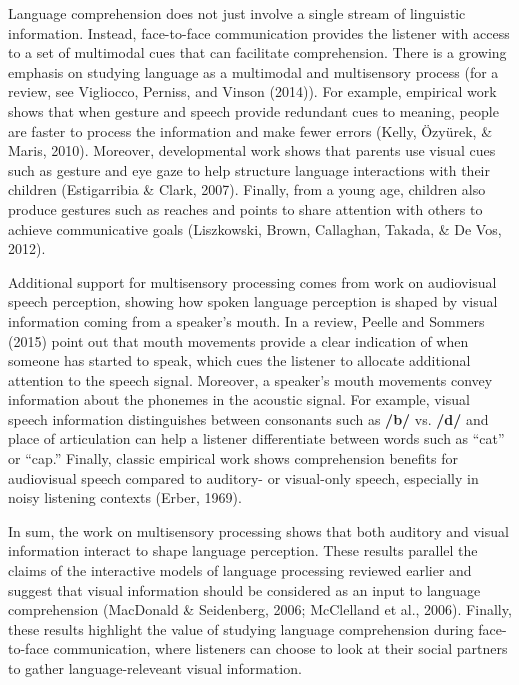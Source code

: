 \documentclass[english,floatsintext,man]{apa6}
\begin{document}
Language comprehension does not just involve a single stream of
linguistic information. Instead, face-to-face communication provides the
listener with access to a set of multimodal cues that can facilitate
comprehension. There is a growing emphasis on studying language as a
multimodal and multisensory process (for a review, see Vigliocco,
Perniss, and Vinson (2014)). For example, empirical work shows that when
gesture and speech provide redundant cues to meaning, people are faster
to process the information and make fewer errors (Kelly, Özyürek, \&
Maris, 2010). Moreover, developmental work shows that parents use visual
cues such as gesture and eye gaze to help structure language
interactions with their children (Estigarribia \& Clark, 2007). Finally,
from a young age, children also produce gestures such as reaches and
points to share attention with others to achieve communicative goals
(Liszkowski, Brown, Callaghan, Takada, \& De Vos, 2012).

Additional support for multisensory processing comes from work on
audiovisual speech perception, showing how spoken language perception is
shaped by visual information coming from a speaker's mouth. In a review,
Peelle and Sommers (2015) point out that mouth movements provide a clear
indication of when someone has started to speak, which cues the listener
to allocate additional attention to the speech signal. Moreover, a
speaker's mouth movements convey information about the phonemes in the
acoustic signal. For example, visual speech information distinguishes
between consonants such as \textbf{/b/} vs. \textbf{/d/} and place of
articulation can help a listener differentiate between words such as
\enquote{cat} or \enquote{cap.} Finally, classic empirical work shows
comprehension benefits for audiovisual speech compared to auditory- or
visual-only speech, especially in noisy listening contexts (Erber,
1969).

In sum, the work on multisensory processing shows that both auditory and
visual information interact to shape language perception. These results
parallel the claims of the interactive models of language processing
reviewed earlier and suggest that visual information should be
considered as an input to language comprehension (MacDonald \&
Seidenberg, 2006; McClelland et al., 2006). Finally, these results
highlight the value of studying language comprehension during
face-to-face communication, where listeners can choose to look at their
social partners to gather language-releveant visual information.
\end{document}
